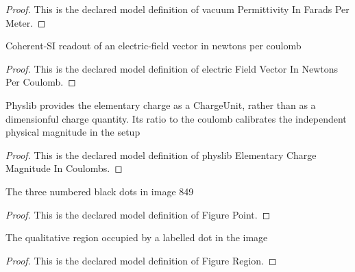 \begin{proof}
  This is the declared model definition of vacuum Permittivity In Farads Per Meter.
\end{proof}
\begin{definition}
  \label{def:physics:phyx-mini-0849:phyxminiproblems-problemphyxmini0849-electricfieldvectorinnewtonspercoulomb}
  Coherent-SI readout of an electric-field vector in newtons per coulomb
\end{definition}
\begin{proof}
  This is the declared model definition of electric Field Vector In Newtons Per Coulomb.
\end{proof}
\begin{definition}
  \label{def:physics:phyx-mini-0849:phyxminiproblems-problemphyxmini0849-physlibelementarychargemagnitudeincoulombs}
  Physlib provides the elementary charge as a ChargeUnit, rather than as a dimensionful charge quantity. Its ratio to the coulomb calibrates the independent physical magnitude in the setup
\end{definition}
\begin{proof}
  This is the declared model definition of physlib Elementary Charge Magnitude In Coulombs.
\end{proof}
\begin{definition}
  \label{def:physics:phyx-mini-0849:phyxminiproblems-problemphyxmini0849-figurepoint}
  The three numbered black dots in image 849
\end{definition}
\begin{proof}
  This is the declared model definition of Figure Point.
\end{proof}
\begin{definition}
  \label{def:physics:phyx-mini-0849:phyxminiproblems-problemphyxmini0849-figureregion}
  The qualitative region occupied by a labelled dot in the image
\end{definition}
\begin{proof}
  This is the declared model definition of Figure Region.
\end{proof}
